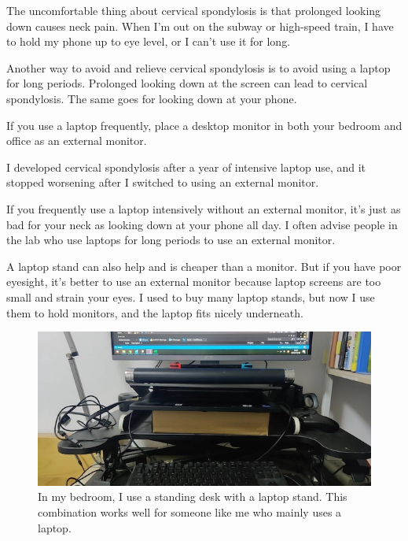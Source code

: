 The uncomfortable thing about cervical spondylosis is that prolonged looking down causes neck pain. When I'm out on the subway or high-speed train, I have to hold my phone up to eye level, or I can't use it for long.

Another way to avoid and relieve cervical spondylosis is to avoid using a laptop for long periods. Prolonged looking down at the screen can lead to cervical spondylosis. The same goes for looking down at your phone.

If you use a laptop frequently, place a desktop monitor in both your bedroom and office as an external monitor.

I developed cervical spondylosis after a year of intensive laptop use, and it stopped worsening after I switched to using an external monitor.

If you frequently use a laptop intensively without an external monitor, it's just as bad for your neck as looking down at your phone all day. I often advise people in the lab who use laptops for long periods to use an external monitor.

A laptop stand can also help and is cheaper than a monitor. But if you have poor eyesight, it's better to use an external monitor because laptop screens are too small and strain your eyes. I used to buy many laptop stands, but now I use them to hold monitors, and the laptop fits nicely underneath.

\begin{figure}[H]
    \caption{In my bedroom, I use a standing desk with a laptop stand. This combination works well for someone like me who mainly uses a laptop.}
    \includegraphics[width=0.95\columnwidth, center]{author-folder/Jialin.Wang/shengjiangzhuo.jpeg}
\end{figure}


